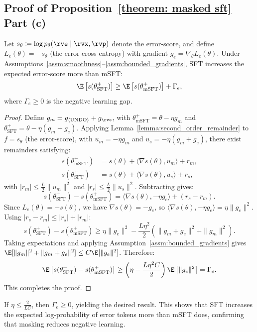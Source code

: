 \subsection{Proof of Proposition~\ref{theorem: masked sft} Part (c)}

\begin{proposition}
Let $s_\theta \coloneqq \log p_\theta(\rve \mid \rvx, \rvp)$ denote the error-score, and define $L_e(\theta) = -s_\theta$ (the error cross-entropy) with gradient $g_e = \nabla_\theta L_e(\theta)$. Under Assumptions~\ref{assm:smoothness}--\ref{assm:bounded_gradients}, SFT increases the expected error-score more than mSFT:
\begin{equation}
    \E\left[s(\theta_\text{SFT}^+)\right] \geq \E\left[s(\theta_\text{mSFT}^+)\right] + \Gamma_e,
\end{equation}
where $\Gamma_e \geq 0$ is the negative learning gap.
\end{proposition}

\begin{proof}
Define $g_m = g_{\bk} + g_\rvc$, with $\theta_\text{mSFT}^+ = \theta - \eta g_m$ and $\theta_\text{SFT}^+ = \theta - \eta(g_m + g_e)$. Applying Lemma~\ref{lemma:second_order_remainder} to $f = s_\theta$ (the error-score), with $u_m = -\eta g_m$ and $u_s = -\eta(g_m + g_e)$, there exist remainders satisfying:
\begin{align}
    s(\theta_\text{mSFT}^+) &= s(\theta) + \langle \nabla s(\theta), u_m \rangle + r_m, \\
    s(\theta_\text{SFT}^+) &= s(\theta) + \langle \nabla s(\theta), u_s \rangle + r_s,
\end{align}
with $|r_m| \leq \frac{L}{2}\|u_m\|^2$ and $|r_s| \leq \frac{L}{2}\|u_s\|^2$. Subtracting gives:
\begin{equation}
    s(\theta_\text{SFT}^+) - s(\theta_\text{mSFT}^+) = \langle \nabla s(\theta), -\eta g_e \rangle + (r_s - r_m).
\end{equation}
Since $L_e(\theta) = -s(\theta)$, we have $\nabla s(\theta) = -g_e$, so $\langle \nabla s(\theta), -\eta g_e \rangle = \eta \|g_e\|^2$. Using $|r_s - r_m| \leq |r_s| + |r_m|$:
\begin{equation}
    s(\theta_\text{SFT}^+) - s(\theta_\text{mSFT}^+) \geq \eta \|g_e\|^2 - \frac{L\eta^2}{2}\left(\|g_m + g_e\|^2 + \|g_m\|^2\right).
\end{equation}
Taking expectations and applying Assumption~\ref{assm:bounded_gradients} gives $\E[\|g_m\|^2 + \|g_m + g_e\|^2] \leq C \E[\|g_e\|^2]$. Therefore:
\begin{equation}
    \E\left[s(\theta_\text{SFT}^+) - s(\theta_\text{mSFT}^+)\right] \geq \left(\eta - \frac{L\eta^2 C}{2}\right) \E\left[\|g_e\|^2\right] = \Gamma_e.
\end{equation}
This completes the proof.
\end{proof}
If $\eta \leq \frac{2}{LC}$, then $\Gamma_e \geq 0$, yielding the desired result. This shows that SFT increases the expected log-probability of error tokens more than mSFT does, confirming that masking reduces negative learning.
